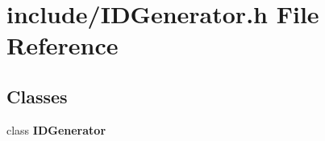 \section{include/\+I\+D\+Generator.h File Reference}
\label{_i_d_generator_8h}
\subsection*{Classes}
\begin{DoxyCompactItemize}
\item 
class \textbf{ I\+D\+Generator}
\end{DoxyCompactItemize}
